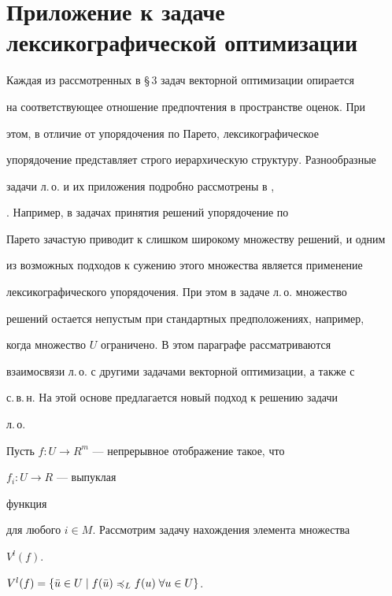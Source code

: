 \section{Приложение к задаче лексикографической оптимизации}





Каждая из рассмотренных в \S\,3 задач векторной оптимизации опирается


на соответствующее отношение предпочтения в пространстве оценок. При


этом, в отличие от упорядочения по Парето, лексикографическое


упорядочение представляет строго иерархическую структуру. Разнообразные


задачи л.\,о. и их приложения подробно рассмотрены в \cite{Pod1},


\cite{Fish}. Например, в задачах принятия решений упорядочение по


Парето зачастую приводит к слишком широкому множеству решений, и одним


из возможных подходов к сужению этого множества является применение


лексикографического упорядочения. При этом в задаче л.\,о. множество


решений остается непустым при стандартных предположениях, например,


когда множество $U$ ограничено. В этом параграфе рассматриваются


взаимосвязи л.\,о. с другими задачами векторной оптимизации, а также с


с.\,в.\,н. На этой основе предлагается новый подход к решению задачи


л.\,о.





Пусть $f:U\to R^m$ --- непрерывное отображение такое, что


$f_i:U\to R$ --- выпуклая


функция


для любого $i\in M$. Рассмотрим задачу нахождения элемента множества


$V^l(f)$.





\begin{lems}


$V^l(f)=\{\Bar u\in U\mid f(\Bar u)\pce_L f(u)\;


\forall u\in U\}$.


\end{lems}





